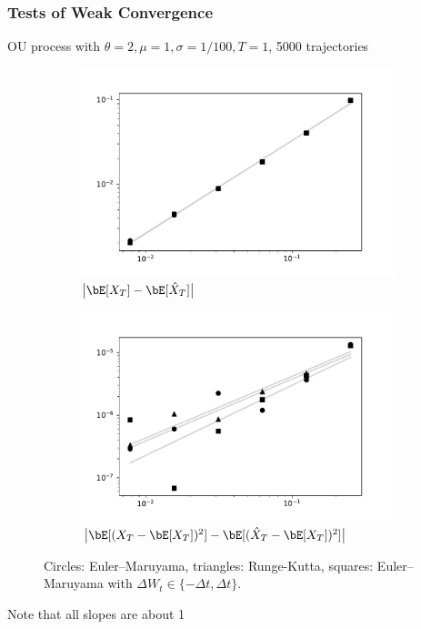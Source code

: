 \documentclass{beamer}
\begin{document}
\begin{frame}
\frametitle{Tests of Weak Convergence}
OU process with \( \theta = 2, \mu=1,\sigma=1/100, T=1 \), 5000 trajectories
\begin{figure}[ht!]\centering
\begin{subfigure}{.48\textwidth}\centering
    \includegraphics[width=\textwidth]{../img/weak_order_5000.pdf}
    \caption{\tiny\( \big|\bE[X_T] - \bE[\hat{X}_T]\big| \)}
    \label{mean}
\end{subfigure}
\begin{subfigure}{.48\textwidth}\centering
    \includegraphics[width=\textwidth]{../img/weak_order_var_5000.pdf}
    \caption{\tiny\( \big|\bE[(X_T-\bE[X_T])^2] - \bE[(\hat{X}_T-\bE[X_T])^2]\big| \) }
    \label{var}
\end{subfigure}
\caption{Circles: Euler--Maruyama, triangles:  Runge-Kutta, squares: Euler--Maruyama with \( \Delta W_t \in \{-\Delta t, \Delta t\} \). }
\label{weak_order_test}
\end{figure}
Note that all slopes are about 1
\end{frame}
\end{document}
